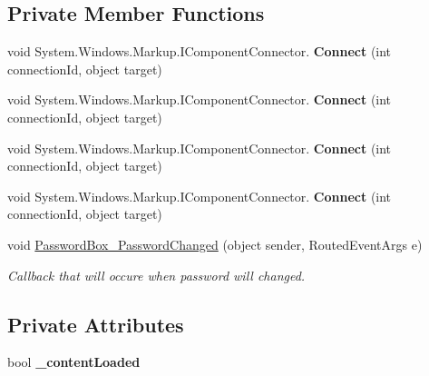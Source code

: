 \subsection*{Private Member Functions}
\begin{DoxyCompactItemize}
\item 
\mbox{\label{class_wpf_handler_1_1_u_i_1_1_controls_1_1_flat_password_box_aa1a26564d3ca85c782b1df934f12cd24}} 
void System.\+Windows.\+Markup.\+I\+Component\+Connector. {\bfseries Connect} (int connection\+Id, object target)
\item 
\mbox{\label{class_wpf_handler_1_1_u_i_1_1_controls_1_1_flat_password_box_aa1a26564d3ca85c782b1df934f12cd24}} 
void System.\+Windows.\+Markup.\+I\+Component\+Connector. {\bfseries Connect} (int connection\+Id, object target)
\item 
\mbox{\label{class_wpf_handler_1_1_u_i_1_1_controls_1_1_flat_password_box_aa1a26564d3ca85c782b1df934f12cd24}} 
void System.\+Windows.\+Markup.\+I\+Component\+Connector. {\bfseries Connect} (int connection\+Id, object target)
\item 
\mbox{\label{class_wpf_handler_1_1_u_i_1_1_controls_1_1_flat_password_box_aa1a26564d3ca85c782b1df934f12cd24}} 
void System.\+Windows.\+Markup.\+I\+Component\+Connector. {\bfseries Connect} (int connection\+Id, object target)
\item 
void \mbox{\hyperlink{class_wpf_handler_1_1_u_i_1_1_controls_1_1_flat_password_box_a617fc7b1bc409502029cffd2b3c53d36}{Password\+Box\+\_\+\+Password\+Changed}} (object sender, Routed\+Event\+Args e)
\begin{DoxyCompactList}\small\item\em Callback that will occure when password will changed. \end{DoxyCompactList}\end{DoxyCompactItemize}
\subsection*{Private Attributes}
\begin{DoxyCompactItemize}
\item 
\mbox{\label{class_wpf_handler_1_1_u_i_1_1_controls_1_1_flat_password_box_aeb6fb2434a8bb98dd12230ccd58c59da}} 
bool {\bfseries \+\_\+content\+Loaded}
\end{DoxyCompactItemize}
